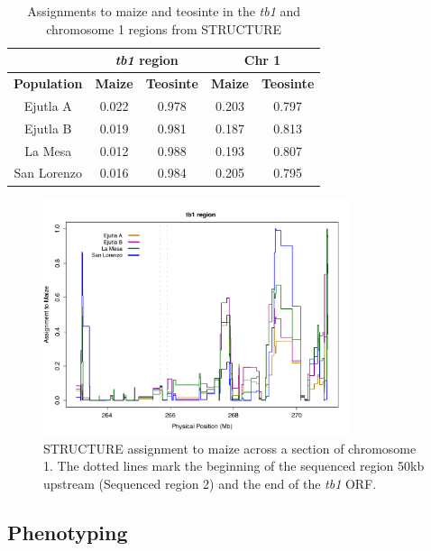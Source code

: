 \documentclass[11pt]{article}
\begin{document}
\begin{linenumbers}
\begin{flushleft}
\begin{table}[htbp]
  \centering
  \caption{Assignments to maize and teosinte in the \emph{tb1} and chromosome 1 regions from STRUCTURE}
    \begin{tabular}{ccccc} \
          & \multicolumn{2}{c}{\textbf{\emph{tb1} region}} & \multicolumn{2}{c}{\textbf{Chr 1}} \\\toprule
    \bf{Population} & \bf{Maize} & \bf{Teosinte} & \bf{Maize} & \bf{Teosinte} \\\midrule
    Ejutla A & 0.022 & 0.978 & 0.203 & 0.797 \\
    Ejutla B & 0.019 & 0.981 & 0.187 & 0.813 \\
    La Mesa & 0.012 & 0.988 & 0.193 & 0.807 \\
    San Lorenzo & 0.016 & 0.984 & 0.205 & 0.795 \\\bottomrule
    \end{tabular}
  \label{Table4Q}
\end{table}

\begin{figure}[!t]
  \begin{center}
   \includegraphics[width=90mm]{Fig3Structure.pdf}
    \caption{STRUCTURE assignment to maize across a section of chromosome 1. The dotted lines mark the beginning of the sequenced region 50kb upstream (Sequenced region 2) and the end of the \emph{tb1} ORF. } 
\label{Fig3Structure}
  \end{center}
\end{figure}

\subsection*{Phenotyping}


\end{flushleft}
\end{linenumbers}
\end{document}

